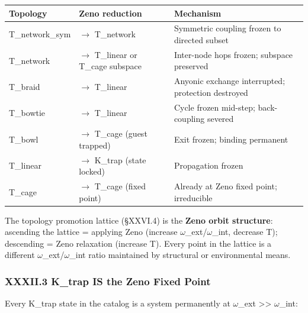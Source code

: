 \documentclass[12pt,a4paper]{article}
\begin{document}
\begin{table}[htbp]
\centering
\small
{}
\begin{tabularx}{\textwidth}{>{\centering\arraybackslash}X >{\centering\arraybackslash}X >{\centering\arraybackslash}X}
\toprule
\rowcolor{gray!25}\textbf{Topology} & \textbf{Zeno reduction} & \textbf{Mechanism} \\
\midrule
\rowcolors{1}{white}{gray!10}
T\_network\_sym & $\rightarrow$ T\_network & Symmetric coupling frozen to directed subset \\
T\_network & $\rightarrow$ T\_linear or T\_cage subspace & Inter-node hops frozen; subspace preserved \\
T\_braid & $\rightarrow$ T\_linear & Anyonic exchange interrupted; protection destroyed \\
T\_bowtie & $\rightarrow$ T\_linear & Cycle frozen mid-step; back-coupling severed \\
T\_bowl & $\rightarrow$ T\_cage (guest trapped) & Exit frozen; binding permanent \\
T\_linear & $\rightarrow$ K\_trap (state locked) & Propagation frozen \\
T\_cage & $\rightarrow$ T\_cage (fixed point) & Already at Zeno fixed point; irreducible \\
\bottomrule
\end{tabularx}
\end{table}

The topology promotion lattice (§XXVI.4) is the \textbf{Zeno orbit structure}: ascending the lattice = applying Zeno (increase $\omega$\_ext/$\omega$\_int, decrease T); descending = Zeno relaxation (increase T). Every point in the lattice is a different $\omega$\_ext/$\omega$\_int ratio maintained by structural or environmental means.

\subsubsection{XXXII.3 K\_trap IS the Zeno Fixed Point}

Every K\_trap state in the catalog is a system permanently at $\omega$\_ext \textgreater{}\textgreater{} $\omega$\_int:
\end{document}
